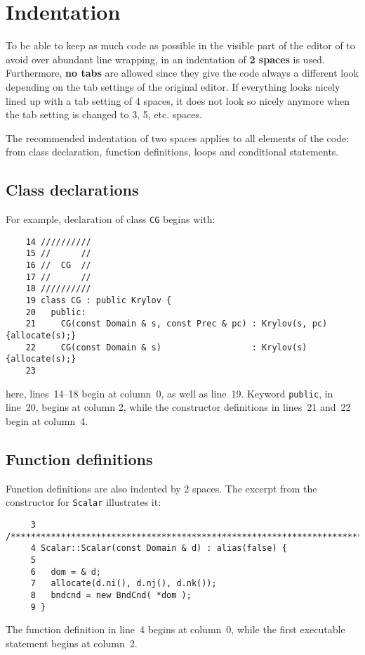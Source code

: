 \section{Indentation}
\label{sec:indentation}

To be able to keep as much code as possible in the visible part of the 
editor of to avoid over abundant line wrapping, in {\psiboil} an indentation 
of {\bf 2 spaces} is used. Furthermore, {\bf no tabs} are allowed since they 
give the code always a different look depending on the tab settings of the 
original editor. If everything looks nicely lined up with a tab setting of 4 
spaces, it does not look so nicely anymore when the tab setting is changed 
to 3, 5, etc. spaces.

The recommended indentation of two spaces applies to all elements of the code:
from class declaration, function definitions, loops and conditional statements.

\subsection{Class declarations}

For example, declaration of class {\tt CG} begins with:
%
{\small \begin{verbatim}
    14 //////////
    15 //      //
    16 //  CG  //
    17 //      //
    18 //////////
    19 class CG : public Krylov {
    20   public:
    21     CG(const Domain & s, const Prec & pc) : Krylov(s, pc) {allocate(s);}
    22     CG(const Domain & s)                  : Krylov(s)     {allocate(s);}
    23 
\end{verbatim}}
% 
here, lines~14--18 begin at column~0, as well as line~19. Keyword {\tt public},
in line~20, begins at column 2, while the constructor definitions in lines~21
and~22 begin at column~4.

\subsection{Function definitions}

Function definitions are also indented by 2 spaces. The excerpt from the 
constructor for {\tt Scalar} illustrates it:
%
{\small \begin{verbatim}
     3 /******************************************************************************/
     4 Scalar::Scalar(const Domain & d) : alias(false) {
     5 
     6   dom = & d;
     7   allocate(d.ni(), d.nj(), d.nk());
     8   bndcnd = new BndCnd( *dom );
     9 }
\end{verbatim}}
% 
The function definition in line~4 begins at column~0, while the first executable
statement begins at column~2. 

